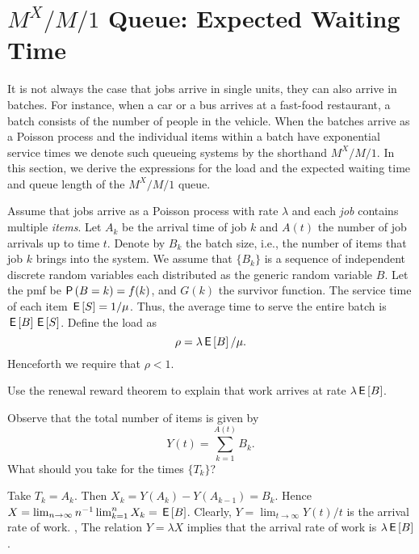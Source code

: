 \section
{$M^X/M/1$ Queue: Expected Waiting Time}
\label{sec:mxm1-queue:-expected}



It is not always the case that jobs arrive in single units, they can also arrive in batches.
For instance, when a car or a bus arrives at a fast-food restaurant, a batch consists of the number of people in the vehicle.
When the batches arrive as a Poisson process and the individual items within a batch have exponential service times we denote such queueing systems by the shorthand $M^X/M/1$.
In this section, we derive the expressions for the load and the expected waiting time and queue length of the $M^X/M/1$ queue.


Assume that jobs arrive as a Poisson process with rate $\lambda$ and each \emph{job} contains multiple \emph{items}.
Let $A_k$ be the arrival time of job $k$ and $A(t)$ the number of job arrivals up to time $t$.
Denote by $B_k$ the batch size, i.e., the number of items that job $k$ brings into the system.
We assume that $\{B_k\}$ is a sequence of independent discrete random variables each distributed as the generic random variable $B$.
Let the pmf be $\P{B = k} = f(k)$, and $G(k)$ the survivor function.
The service time of each item $\,\mathsf{E}\left[S\right] = 1/\mu$.
Thus, the average time to serve the entire batch is $\,\mathsf{E}\left[B\right] \,\mathsf{E}\left[S\right]$.
 Define the load as
\begin{equation*}
\rho = \lambda \,\mathsf{E}\left[B\right]/\mu.
\end{equation*}
Henceforth we require that $\rho< 1$.


\begin{exercise} 
Use the renewal reward theorem to explain that work arrives at rate $\lambda \,\mathsf{E}\left[B\right]$.
\begin{hint}
Observe that the total number of items is given by
\begin{equation*}
Y(t)= \sum_{k=1}^{A(t)} B_k.
\end{equation*}
What should you take for the times $\{T_k\}$? 
\end{hint}
\begin{solution}
Take $T_k = A_k$. Then $X_k = Y(A_k) - Y(A_{k-1}) = B_k$. Hence $X = \lim_{n\to\infty} n^{-1} \lim_{k=1}^n X_k = \,\mathsf{E}\left[B\right]$. Clearly, $Y = \lim_{t\to\infty} Y(t)/t$ is the arrival rate of work. , The relation $Y=\lambda X$ implies that the arrival rate of work is $\lambda \,\mathsf{E}\left[B\right]$. 
\end{solution}
\end{exercise}


